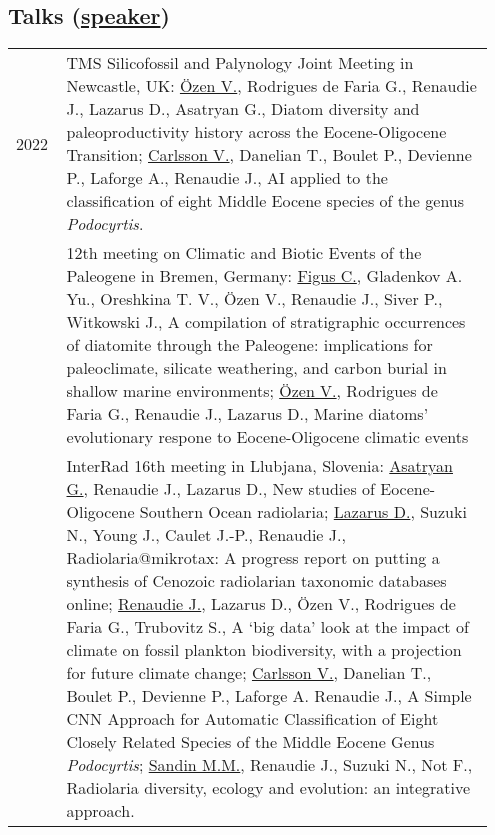 \documentclass[11pt, a4paper]{article}
\begin{document}
\subsection[Talks]{Talks \textnormal{\footnotesize{(\underline{speaker})}}}
\begin{longtable}{@{}p{0.1\linewidth} P{0.85\linewidth}@{}}
2022 
 & TMS Silicofossil and Palynology Joint Meeting in Newcastle, UK: \underline{Özen V.}, Rodrigues de Faria G., Renaudie J., Lazarus D., Asatryan G., Diatom diversity and paleoproductivity history across the Eocene-Oligocene Transition; \underline{Carlsson V.}, Danelian T., Boulet P., Devienne P., Laforge A., Renaudie J., AI applied to the classification of eight Middle Eocene species of the genus \textit{Podocyrtis}.\\
 & 12th meeting on Climatic and Biotic Events of the Paleogene in Bremen, Germany: \underline{Figus C.}, Gladenkov A. Yu., Oreshkina T. V., Özen V., Renaudie J., Siver P., Witkowski J., A compilation of stratigraphic occurrences of diatomite through the Paleogene: implications for paleoclimate, silicate weathering, and carbon burial in shallow marine environments; \underline{Özen V.}, Rodrigues de Faria G., Renaudie J., Lazarus D., Marine diatoms' evolutionary respone to Eocene-Oligocene climatic events\\
 & InterRad 16th meeting in Llubjana, Slovenia: \underline{Asatryan G.}, Renaudie J., Lazarus D., New studies of Eocene-Oligocene Southern Ocean radiolaria; \underline{Lazarus D.}, Suzuki N., Young J., Caulet J.-P., Renaudie J., Radiolaria@mikrotax: A progress report on putting a synthesis of Cenozoic radiolarian taxonomic databases online; \underline{Renaudie J.}, Lazarus D., Özen V., Rodrigues de Faria G., Trubovitz S., A `big data' look at the impact of climate on fossil plankton biodiversity, with a projection for future climate change; \underline{Carlsson V.}, Danelian T., Boulet P., Devienne P., Laforge A. Renaudie J., A Simple CNN Approach for Automatic Classification of Eight Closely Related Species of the Middle Eocene Genus \textit{Podocyrtis}; \underline{Sandin M.M.}, Renaudie J., Suzuki N., Not F., Radiolaria diversity, ecology and evolution: an integrative approach.\\

\end{longtable}
\end{document}

